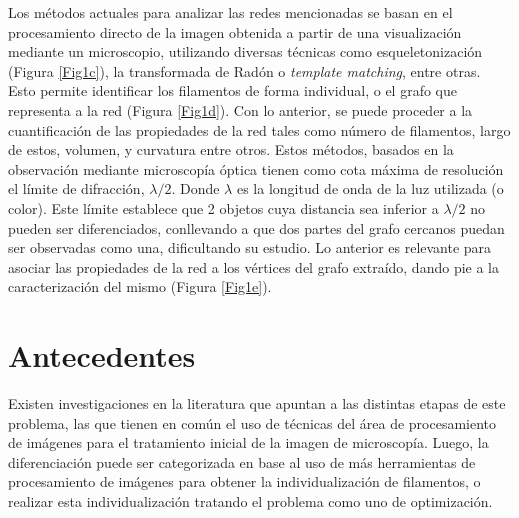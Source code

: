 \documentclass{article}
\begin{document}
\vspace{.5cm}
Los m\'etodos actuales para analizar las redes mencionadas se basan en el procesamiento directo de la imagen obtenida a partir de una visualizaci\'on mediante un microscopio, utilizando diversas t\'ecnicas como esqueletonizaci\'on (Figura \ref{Fig1c}), la transformada de Rad\'on o {\it template matching}, entre otras. Esto permite identificar los filamentos de forma individual, o el grafo que representa a la red (Figura \ref{Fig1d}).
Con lo anterior, se puede proceder a la cuantificaci\'on de las propiedades de la red tales como n\'umero de filamentos, largo de estos, volumen, y curvatura entre otros. Estos m\'etodos, basados en la observaci\'on mediante microscop\'ia \'optica tienen como cota m\'axima de resoluci\'on el l\'imite de difracci\'on, $\lambda/2$. Donde $\lambda$ es la longitud de onda de la luz utilizada (o color). Este l\'imite establece que 2 objetos cuya distancia sea inferior a $\lambda/2$ no pueden ser diferenciados, conllevando a que dos partes del grafo cercanos puedan ser observadas como una, dificultando su estudio. Lo anterior es relevante para asociar las propiedades de la red a los v\'ertices del grafo extra\'ido, dando pie a la caracterizaci\'on del mismo (Figura \ref{Fig1e}).
\section{Antecedentes}
Existen investigaciones en la literatura que apuntan a las distintas etapas de este problema, las que tienen en com\'un el uso de t\'ecnicas del \'area de procesamiento de im\'agenes para el tratamiento inicial de la imagen de microscop\'ia. Luego, la diferenciaci\'on puede ser categorizada en base al uso de m\'as herramientas de procesamiento de im\'agenes para obtener la individualizaci\'on de filamentos, o realizar esta individualizaci\'on tratando el problema como uno de optimizaci\'on. 
\end{document}
